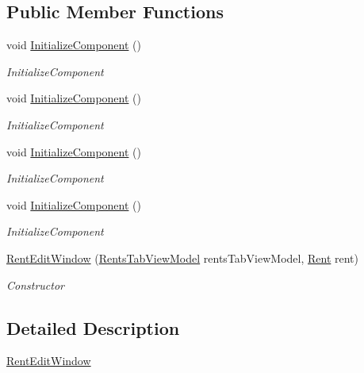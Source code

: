 \subsection*{Public Member Functions}
\begin{DoxyCompactItemize}
\item 
void \hyperlink{class_baudi_1_1_client_1_1_view_1_1_edit_windows_1_1_rent_edit_window_a52295348132eb0f8d609bf9626938746}{Initialize\+Component} ()
\begin{DoxyCompactList}\small\item\em Initialize\+Component \end{DoxyCompactList}\item 
void \hyperlink{class_baudi_1_1_client_1_1_view_1_1_edit_windows_1_1_rent_edit_window_a52295348132eb0f8d609bf9626938746}{Initialize\+Component} ()
\begin{DoxyCompactList}\small\item\em Initialize\+Component \end{DoxyCompactList}\item 
void \hyperlink{class_baudi_1_1_client_1_1_view_1_1_edit_windows_1_1_rent_edit_window_a52295348132eb0f8d609bf9626938746}{Initialize\+Component} ()
\begin{DoxyCompactList}\small\item\em Initialize\+Component \end{DoxyCompactList}\item 
void \hyperlink{class_baudi_1_1_client_1_1_view_1_1_edit_windows_1_1_rent_edit_window_a52295348132eb0f8d609bf9626938746}{Initialize\+Component} ()
\begin{DoxyCompactList}\small\item\em Initialize\+Component \end{DoxyCompactList}\item 
\hyperlink{class_baudi_1_1_client_1_1_view_1_1_edit_windows_1_1_rent_edit_window_a08c64dafa514d4a64dc0ea355d6069f3}{Rent\+Edit\+Window} (\hyperlink{class_baudi_1_1_client_1_1_view_models_1_1_tabs_view_models_1_1_rents_tab_view_model}{Rents\+Tab\+View\+Model} rents\+Tab\+View\+Model, \hyperlink{class_baudi_1_1_d_a_l_1_1_models_1_1_rent}{Rent} rent)
\begin{DoxyCompactList}\small\item\em Constructor \end{DoxyCompactList}\end{DoxyCompactItemize}


\subsection{Detailed Description}
\hyperlink{class_baudi_1_1_client_1_1_view_1_1_edit_windows_1_1_rent_edit_window}{Rent\+Edit\+Window} 

